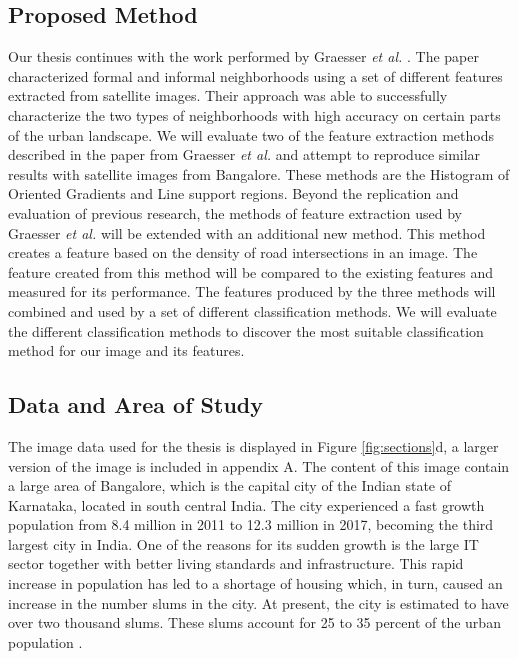 

 
\subsection{Proposed Method}

Our thesis continues with the work performed by Graesser \textit{et al.} \cite{graesser2012image}. The paper characterized formal and informal neighborhoods using a set of different features extracted from satellite images. Their approach was able to successfully characterize the two types of neighborhoods with high accuracy on certain parts of the urban landscape. We will evaluate two of the feature extraction methods described in the paper from Graesser \textit{et al.} and attempt to reproduce similar results with satellite images from Bangalore. These methods are the Histogram of Oriented Gradients and Line support regions. Beyond the replication and evaluation of previous research, the methods of feature extraction used by Graesser \textit{et al.} will be extended with an additional new method. This method creates a feature based on the density of road intersections in an image. The feature created from this method will be compared to the existing features and measured for its performance. The features produced by the three methods will combined and used by a set of different classification methods.
We will evaluate the different classification methods to discover the most suitable classification method for our image and its features. 



\subsection{Data and Area of Study}
The image data used for the thesis is displayed in Figure \ref{fig:sections}d, a larger version of the image is included in appendix A. The content of this image contain a large area of Bangalore, which is the capital city of the Indian state of Karnataka, located in south central India. The city experienced a fast growth population from 8.4 million in 2011 to 12.3 million in 2017, becoming the third largest city in India\cite{popcount2017}. One of the reasons for its sudden growth is the large IT sector together with better living standards and infrastructure. This rapid increase in population has led to a shortage of housing which, in turn, caused an increase in the number slums in the city. At present, the city is estimated to have over two thousand slums. These slums account for 25 to 35 percent of the urban population \cite{roy2018survey}.

